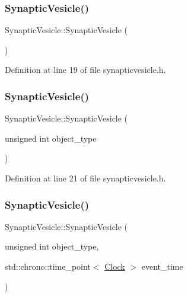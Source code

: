 \subsubsection{\texorpdfstring{Synaptic\+Vesicle()}{SynapticVesicle()}\hspace{0.1cm}{\footnotesize\ttfamily [1/4]}}
{\footnotesize\ttfamily Synaptic\+Vesicle\+::\+Synaptic\+Vesicle (\begin{DoxyParamCaption}{ }\end{DoxyParamCaption})\hspace{0.3cm}{\ttfamily [inline]}}



Definition at line 19 of file synapticvesicle.\+h.

\mbox{\label{class_synaptic_vesicle_aefd8a743e80077235a1c9a9fd133cc9d}} 
\subsubsection{\texorpdfstring{Synaptic\+Vesicle()}{SynapticVesicle()}\hspace{0.1cm}{\footnotesize\ttfamily [2/4]}}
{\footnotesize\ttfamily Synaptic\+Vesicle\+::\+Synaptic\+Vesicle (\begin{DoxyParamCaption}\item[{unsigned int}]{object\+\_\+type }\end{DoxyParamCaption})\hspace{0.3cm}{\ttfamily [inline]}}



Definition at line 21 of file synapticvesicle.\+h.

\mbox{\label{class_synaptic_vesicle_a6602b03ba498129b46c173e8fa66927b}} 
\subsubsection{\texorpdfstring{Synaptic\+Vesicle()}{SynapticVesicle()}\hspace{0.1cm}{\footnotesize\ttfamily [3/4]}}
{\footnotesize\ttfamily Synaptic\+Vesicle\+::\+Synaptic\+Vesicle (\begin{DoxyParamCaption}\item[{unsigned int}]{object\+\_\+type,  }\item[{std\+::chrono\+::time\+\_\+point$<$ \mbox{\hyperlink{universe_8h_a0ef8d951d1ca5ab3cfaf7ab4c7a6fd80}{Clock}} $>$}]{event\+\_\+time }\end{DoxyParamCaption})\hspace{0.3cm}{\ttfamily [inline]}}



